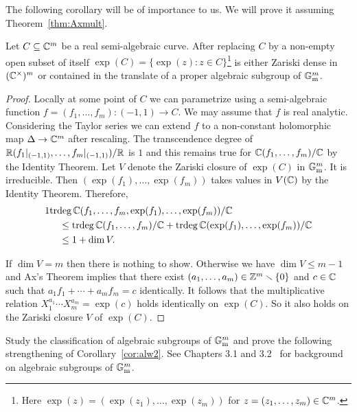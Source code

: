 The following corollary will be of importance to us. We will prove it
assuming Theorem~\ref{thm:Axmult}. 

\begin{corollary}
  \label{cor:alw}
  Let $C\subseteq{\mathbb{C}}^m$ be a real semi-algebraic curve.
  After replacing $C$ by a non-empty open subset of itself
 $\exp(C)=\{\exp(z) :z\in
  C\}$\footnote{Here $\exp(z) = (\exp(z_1),\ldots,\exp(z_m))$ for
    $z=(z_1,\ldots,z_m)\in{\mathbb{C}}^m$.} is either Zariski dense in
  $({\mathbb{C}}^\times)^m$ or contained in
  the
  translate of a proper algebraic subgroup of ${\mathbb{G}}_{\mathrm{m}}^m$.   
\end{corollary}
\begin{proof}  
  Locally at some point of $C$ we can parametrize using a
  semi-algebraic function $f=(f_1,\ldots,f_m)\colon (-1,1)\rightarrow C$. We may assume
  that $f$ is real
  analytic. Considering the Taylor series we can extend $f$ to a
  non-constant  holomorphic map $\Delta\rightarrow{\mathbb{C}}^m$ after rescaling. The
  transcendence degree of
  ${\mathbb{R}}({f_1}|_{(-1,1)},\ldots,{f_m}|_{(-1,1)})/{\mathbb{R}}$ is $1$ and this
  remains true for ${\mathbb{C}}(f_1,\ldots,f_m)/{\mathbb{C}}$ by the Identity Theorem.
  Let $V$ denote the Zariski closure of $\exp(C)$ in
  ${\mathbb{G}}_{\mathrm{m}}^m$. It is irreducible. 
  Then $(\exp(f_1),\ldots,\exp(f_m))$ takes values in $V({\mathbb{C}})$ by
  the Identity Theorem.
  Therefore,
  \begin{alignat*}1
    &\mathrm{trdeg}\,\IC(f_1,\ldots,f_m,\exp(f_1),\ldots,\exp(f_m))/\IC
    \\
    &\quad \le
    \mathrm{trdeg}\,\IC(f_1,\ldots,f_m)/\IC+\mathrm{trdeg}\,\IC(\exp(f_1),\ldots,\exp(f_m))/\IC\\
    &\quad \le
    1+\dim V.
  \end{alignat*}

  If $\dim V=m$ then there is nothing to show. Otherwise we have $\dim
  V \le m-1$ and 
  Ax's Theorem implies that there exist
  $(a_1,\ldots,a_m)\in{\mathbb{Z}}^m\smallsetminus\{0\}$ and $c\in{\mathbb{C}}$ such that
  $a_1f_1+\cdots+a_mf_m=c$ identically. It follows that the
  multiplicative relation
  $X_1^{a_1}\cdots X_m^{a_m} = \exp(c)$ holds identically on
  $\exp(C)$. So it also holds on the Zariski closure $V$ of $\exp(C)$. 
\end{proof}

\begin{exercise}
  Study the classification of algebraic subgroups of ${\mathbb{G}}_{\mathrm{m}}^m$
  and prove the following strengthening of Corollary~\ref{cor:alw2}.
  See Chapters 3.1 and 3.2~\cite{BG} for background on algebraic
  subgroups of ${\mathbb{G}}_{\mathrm{m}}^m$. 
\end{exercise}


